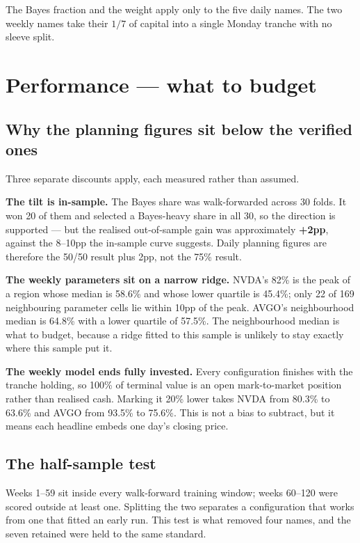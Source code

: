 \documentclass[11pt]{article}
\begin{document}
The Bayes fraction and the weight apply only to the five daily names. The two weekly names take
their $1/7$ of capital into a single Monday tranche with no sleeve split.

\section{Performance --- what to budget}

\subsection{Why the planning figures sit below the verified ones}

Three separate discounts apply, each measured rather than assumed.

\textbf{The tilt is in-sample.} The Bayes share was walk-forwarded across 30 folds. It won 20 of
them and selected a Bayes-heavy share in all 30, so the direction is supported --- but the
realised out-of-sample gain was approximately \textbf{+2pp}, against the 8--10pp the in-sample
curve suggests. Daily planning figures are therefore the 50/50 result plus 2pp, not the 75\%
result.

\textbf{The weekly parameters sit on a narrow ridge.} NVDA's 82\% is the peak of a region whose
median is 58.6\% and whose lower quartile is 45.4\%; only 22 of 169 neighbouring parameter cells
lie within 10pp of the peak. AVGO's neighbourhood median is 64.8\% with a lower quartile of
57.5\%. The neighbourhood median is what to budget, because a ridge fitted to this sample is
unlikely to stay exactly where this sample put it.

\textbf{The weekly model ends fully invested.} Every configuration finishes with the tranche
holding, so 100\% of terminal value is an open mark-to-market position rather than realised cash.
Marking it 20\% lower takes NVDA from 80.3\% to 63.6\% and AVGO from 93.5\% to 75.6\%. This is
not a bias to subtract, but it means each headline embeds one day's closing price.

\subsection{The half-sample test}

Weeks 1--59 sit inside every walk-forward training window; weeks 60--120 were scored outside at
least one. Splitting the two separates a configuration that works from one that fitted an early
run. This test is what removed four names, and the seven retained were held to the same standard.
\end{document}
